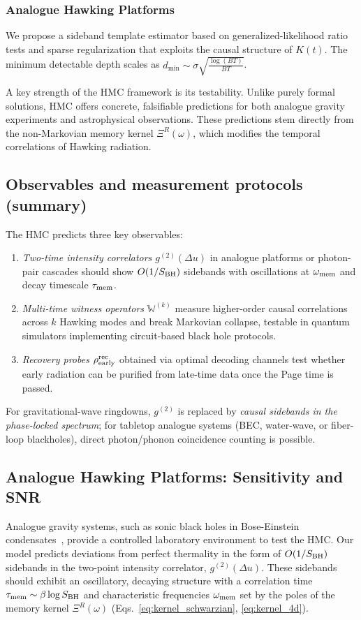 \documentclass[11pt,a4paper]{article}
\newcommand{\HMC}{\textsc{HMC}\xspace}
\theoremstyle{plain}
\theoremstyle{definition}
\theoremstyle{remark}
\begin{document}
\subsubsection{Analogue Hawking Platforms}
We propose a sideband template estimator based on generalized-likelihood ratio tests and sparse regularization that exploits the causal structure of $K(t)$. The minimum detectable depth scales as $d_{\mathrm{min}}\sim \sigma \sqrt{\frac{\log(BT)}{BT}}$. 



A key strength of the \HMC{} framework is its testability. Unlike purely formal solutions, \HMC{} offers concrete, falsifiable predictions for both analogue gravity experiments and astrophysical observations. These predictions stem directly from the non-Markovian memory kernel $\Xi^R(\omega)$, which modifies the temporal correlations of Hawking radiation.

\subsection{Observables and measurement protocols (summary)}
The \HMC{} predicts three key observables:
\begin{enumerate}[label=(\roman*)]
\item \emph{Two-time intensity correlators $g^{(2)}(\Delta u)$} in analogue platforms or photon-pair cascades should show $O(1/S_{\rm BH})$ sidebands with oscillations at $\omega_{\rm mem}$ and decay timescale $\tau_{\rm mem}$.
\item \emph{Multi-time witness operators $\mathbb{W}^{(k)}$} measure higher-order causal correlations across $k$ Hawking modes and break Markovian collapse, testable in quantum simulators implementing circuit-based black hole protocols.
\item \emph{Recovery probes $\rho^{\rm rec}_{\rm early}$} obtained via optimal decoding channels test whether early radiation can be purified from late-time data once the Page time is passed.
\end{enumerate}
For gravitational-wave ringdowns, $g^{(2)}$ is replaced by \emph{causal sidebands in the phase-locked spectrum}; for tabletop analogue systems (BEC, water-wave, or fiber-loop blackholes), direct photon/phonon coincidence counting is possible.

\subsection{Analogue Hawking Platforms: Sensitivity and SNR}
Analogue gravity systems, such as sonic black holes in Bose-Einstein condensates~\cite{Barcelo:2011, Steinhauer:2016}, provide a controlled laboratory environment to test the \HMC{}. Our model predicts deviations from perfect thermality in the form of $O(1/S_{\rm BH})$ sidebands in the two-point intensity correlator, $g^{(2)}(\Delta u)$. These sidebands should exhibit an oscillatory, decaying structure with a correlation time $\tau_{\rm mem}\sim \beta \log S_{\rm BH}$ and characteristic frequencies $\omega_{\rm mem}$ set by the poles of the memory kernel $\Xi^R(\omega)$ (Eqs.~\ref{eq:kernel_schwarzian}, \ref{eq:kernel_4d}).
\end{document}
